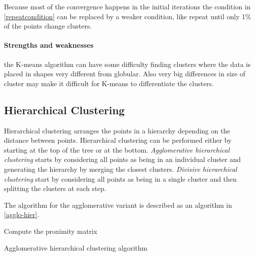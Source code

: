 Because most of the convergence happens in the initial iterations the condition in \cref{repeatcondition} can be replaced by a weaker condition, like repeat until only 1\% of the points change clusters.

\paragraph{Strengths and weaknesses}
the K-means algorithm can have some difficulty finding clusters where the data is placed in shapes very different from globular. 
Also very big differences in size of cluster may make it difficult for K-means to differentiate the clusters.

\subsection{Hierarchical Clustering}

Hierarchical clustering arranges the points in a hierarchy depending on the distance between points.
Hierarchical clustering can be performed either by starting at the top of the tree or at the bottom.
\textit{Agglomerative hierarchical clustering} starts by considering all points as being in an individual cluster and generating the hierarchy by merging the closest clusters. 
\textit{Divisive hierarchical clustering} start by considering all points as being in a single cluster and then splitting the clusters at each step.

The algorithm for the agglomerative variant is described as an algorithm in \cref{agglo-hier}.

\begin{algorithm}
\SetAlgoLined
{}

Compute the proximity matrix\\
\caption{Agglomerative hierarchical clustering algorithm}\label{agglo-hier}
\end{algorithm}

